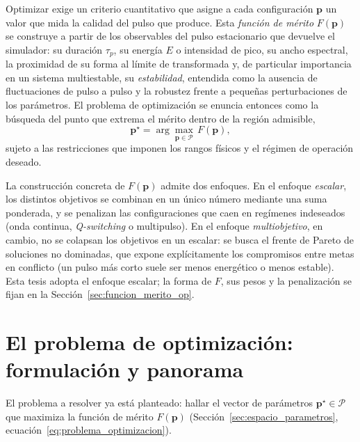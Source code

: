 Optimizar exige un criterio cuantitativo que asigne a cada configuración
$\mathbf{p}$ un valor que mida la calidad del pulso que produce. Esta \emph{función
de mérito} $F(\mathbf{p})$ se construye a partir de los observables del pulso
estacionario que devuelve el simulador: su duración $\tau_p$, su energía $E$ o
intensidad de pico, su ancho espectral, la proximidad de su forma al límite de
transformada y, de particular importancia en un sistema multiestable, su
\emph{estabilidad}, entendida como la ausencia de fluctuaciones de pulso a pulso y
la robustez frente a pequeñas perturbaciones de los parámetros. El problema de
optimización se enuncia entonces como la búsqueda del punto que extrema el mérito
dentro de la región admisible,
%
\begin{equation}
    \mathbf{p}^{\star} = \arg\max_{\mathbf{p}\in\mathcal{P}}\, F(\mathbf{p}),
    \label{eq:problema_optimizacion}
\end{equation}
%
sujeto a las restricciones que imponen los rangos físicos y el régimen de operación
deseado.

La construcción concreta de $F(\mathbf{p})$ admite dos enfoques. En el enfoque
\emph{escalar}, los distintos objetivos se combinan en un único número mediante una
suma ponderada, y se penalizan las configuraciones que caen en regímenes indeseados
(onda continua, \emph{Q-switching} o multipulso). En el enfoque \emph{multiobjetivo},
en cambio, no se colapsan los objetivos en un escalar: se busca el frente de Pareto
de soluciones no dominadas, que expone explícitamente los compromisos entre metas en
conflicto (un pulso más corto suele ser menos energético o menos estable). Esta tesis
adopta el enfoque escalar; la forma de $F$, sus pesos y la penalización se fijan en la
Sección~\ref{sec:funcion_merito_op}.



\section{El problema de optimización: formulación y panorama}
\label{sec:opt_formulacion}

El problema a resolver ya está planteado: hallar el vector de parámetros $\mathbf{p}^{\star}\in\mathcal{P}$ que maximiza la función de mérito $F(\mathbf{p})$ (Sección~\ref{sec:espacio_parametros}, ecuación~\eqref{eq:problema_optimizacion}). 

